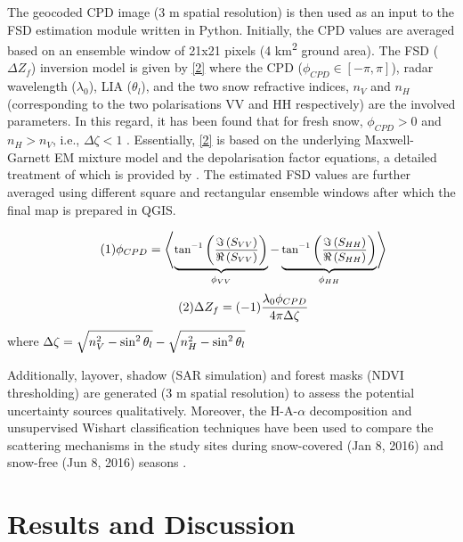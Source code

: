 \documentclass{article}
\begin{document}
The geocoded CPD image (3 m spatial resolution) is then used as an input to the FSD estimation module written in Python. Initially, the CPD values are averaged based on an ensemble window of 21x21 pixels (4 km\textsuperscript{2} ground area). The FSD ($\Delta Z_f$) inversion model is given by \eqref{2} where the CPD ($\phi_{CPD}\in[-\pi,\pi]$), radar wavelength ($\lambda_0$), LIA ($\theta_l$), and the two snow refractive indices, $n_V$ and $n_H$ (corresponding to the two polarisations VV and HH respectively) are the involved parameters. In this regard, it has been found that for fresh snow,  $\phi_{CPD}>0$ and $n_H>n_V$, i.e., $\Delta{\zeta}<1$ \cite{Leinss2014}. Essentially, \eqref{2} is based on the underlying Maxwell-Garnett EM mixture model and the depolarisation factor equations, a detailed treatment of which is provided by \cite{Sihvola1999}. The estimated FSD values are further averaged using different square and rectangular ensemble windows after which the final map is prepared in QGIS.
\vspace{-1.9ex}
\begin{center}
    \vspace{-1.9ex}
    \begin{equation}\tag{1}
        \small{\phi_{CPD} =\left\langle\underbrace{\tan^{-1}\left(\frac{\Im\left(S_{VV}\right)}{\Re\left(S_{VV}\right)}\right)}_{\phi_{VV}} - \underbrace{\tan^{-1}\left(\frac{\Im\left(S_{HH}\right)}{\Re\left(S_{HH}\right)}\right)}_{\phi_{HH}}\right\rangle}
        \label{1}
    \end{equation}
    \begin{equation}\tag{2}
        \small{\Delta{Z_f} = (-1)\frac{\lambda_0\phi_{CPD}}{4\pi\Delta{\zeta}}}
        \label{2}
    \end{equation}
    \centering
    where $\small{\Delta{\zeta} = \sqrt{n^2_V - \sin^{2}\theta_l} - \sqrt{n^2_H - \sin^{2}\theta_l}}$
\end{center}

Additionally, layover, shadow (SAR simulation) and forest masks (NDVI thresholding) are generated (3 m spatial resolution) to assess the potential uncertainty sources qualitatively. Moreover, the H-A-$\alpha$ decomposition and unsupervised Wishart classification techniques have been used to compare the scattering mechanisms in the study sites during snow-covered (Jan 8, 2016) and snow-free (Jun 8, 2016) seasons \cite{Singh2014}.     

\section{Results and Discussion}
\label{sec:results}
\end{document}
